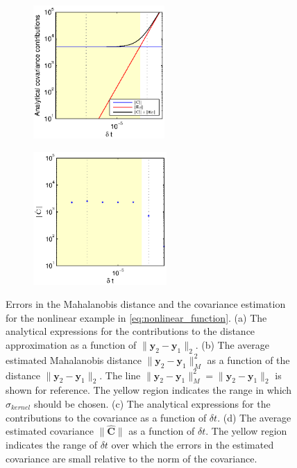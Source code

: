 \begin{figure}[t]
\begin{subfigure}{0.4\textwidth}
\centering
\includegraphics[height=2in]{C_dt_analytical_nonlinear}
\caption{}
\end{subfigure}
%
\begin{subfigure}{0.4\textwidth}
\centering
\includegraphics[height=2in]{C_dt_nonlinear}
\caption{}
\end{subfigure}
%
\caption[Errors in the Mahalanobis distance and the covariance estimation for the nonlinear data]{Errors in the Mahalanobis distance and the covariance estimation for the nonlinear example in \eqref{eq:nonlinear_function}. (a) The analytical expressions for the contributions to the distance approximation as a function of $\| \mathbf{y}_2 - \mathbf{y}_1\|_2$. (b) The average estimated Mahalanobis distance $\| \mathbf{y}_2 - \mathbf{y}_1\|^2_M$ as a function of the distance $\| \mathbf{y}_2 - \mathbf{y}_1\|_2$. The line $\| \mathbf{y}_2 - \mathbf{y}_1\|^2_M = \| \mathbf{y}_2 - \mathbf{y}_1\|_2$ is shown for reference. The yellow region indicates the range in which $\sigma_{kernel}$ should be chosen. (c) The analytical expressions for the contributions to the covariance as a function of $\delta t$. (d) The average estimated covariance $\| \hat{\mathbf{C}} \|$ as a function of $\delta t$. The yellow region indicates the range of $\delta t$ over which the errors in the estimated covariance are small relative to the norm of the covariance. }
\label{fig:cov_error_nonlinear}
\end{figure}

